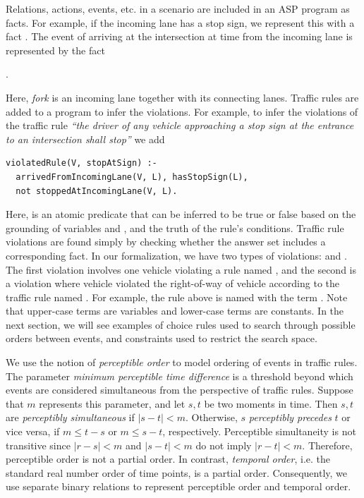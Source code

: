 Relations, actions, events, etc. in a scenario are included in an ASP program as facts.
%
For example, if the incoming lane  has a stop sign, we represent this with a fact  .
%
The event of  arriving at the intersection at time  from the incoming lane  is represented by the fact 
\begin{center}
.    
\end{center}
%
Here, \emph{fork} is an incoming lane together with its connecting lanes.
%
Traffic rules are added to a program to infer the violations.
%
For example, to infer the violations of the traffic rule \emph{``the driver of any vehicle approaching a stop sign at the entrance to an intersection shall stop''} we add
\begin{verbatim}
violatedRule(V, stopAtSign) :-
  arrivedFromIncomingLane(V, L), hasStopSign(L),
  not stoppedAtIncomingLane(V, L).
\end{verbatim}
%
Here,  is an atomic predicate that can be inferred to be true or false based on the grounding of variables  and , and the truth of the rule's conditions.
%
Traffic rule violations are found simply by checking whether the answer set includes a corresponding fact.
%
In our formalization, we have two types of violations:  and .
%
The first violation involves one vehicle  violating a rule named , and the second is a violation where vehicle  violated the right-of-way of vehicle  according to the traffic rule named .
%
For example, the rule above is named with the term .
%
Note that upper-case terms are variables and lower-case terms are constants.
%
In the next section, we will see examples of choice rules used to search through possible orders between events, and constraints used to restrict the search space.


We use the notion of \emph{perceptible order} to model ordering of events in traffic rules.
%
The parameter \emph{minimum perceptible time difference} is a threshold beyond which events are considered simultaneous from the perspective of traffic rules.
%
Suppose that $m$ represents this parameter, and let $s, t$ be two moments in time.
%
Then $s, t$ are \emph{perceptibly simultaneous} if $|s-t| < m$.
%
Otherwise, $s$ \emph{perceptibly precedes} $t$ or vice versa, if $m \leq t-s$ or $m \leq s-t$, respectively.
%
Perceptible simultaneity is not transitive since $|r-s|<m$ and $|s-t|<m$ do not imply $|r-t|<m$.
%
Therefore, perceptible order is not a partial order.
%
In contrast, \emph{temporal order}, i.e. the standard real number order of time points, is a partial order.
%
Consequently, we use separate binary relations to represent perceptible order and temporal order.

